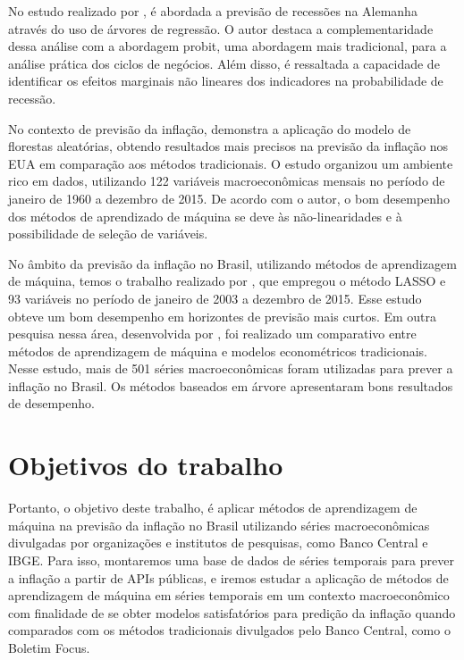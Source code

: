 No estudo realizado por , é abordada a previsão de recessões na Alemanha através do uso de árvores de regressão. O autor destaca a complementaridade dessa análise com a abordagem probit, uma abordagem mais tradicional, para a análise prática dos ciclos de negócios. Além disso, é ressaltada a capacidade de identificar os efeitos marginais não lineares dos indicadores na probabilidade de recessão.

No contexto de previsão da inflação,  demonstra a aplicação do modelo de florestas aleatórias, obtendo resultados mais precisos na previsão da inflação nos EUA em comparação aos métodos tradicionais. O estudo organizou um ambiente rico em dados, utilizando 122 variáveis macroeconômicas mensais no período de janeiro de 1960 a dezembro de 2015. De acordo com o autor, o bom desempenho dos métodos de aprendizado de máquina se deve às não-linearidades e à possibilidade de seleção de variáveis.

No âmbito da previsão da inflação no Brasil, utilizando métodos de aprendizagem de máquina, temos o trabalho realizado por , que empregou o método LASSO e 93 variáveis no período de janeiro de 2003 a dezembro de 2015. Esse estudo obteve um bom desempenho em horizontes de previsão mais curtos. Em outra pesquisa nessa área, desenvolvida por , foi realizado um comparativo entre métodos de aprendizagem de máquina e modelos econométricos tradicionais. Nesse estudo, mais de 501 séries macroeconômicas foram utilizadas para prever a inflação no Brasil. Os métodos baseados em árvore apresentaram bons resultados de desempenho.

\section{Objetivos do trabalho}\label{sec-objetivos}

Portanto, o objetivo deste trabalho, é aplicar métodos de aprendizagem de máquina na previsão da inflação no Brasil utilizando séries macroeconômicas divulgadas por organizações e institutos de pesquisas, como Banco Central e IBGE. Para isso, montaremos uma base de dados de séries temporais para prever a inflação a partir de APIs públicas, e iremos estudar a aplicação de métodos de aprendizagem de máquina em séries temporais em um contexto macroeconômico com finalidade de se obter modelos satisfatórios para predição da inflação quando comparados com os métodos tradicionais divulgados pelo Banco Central, como o Boletim Focus.

